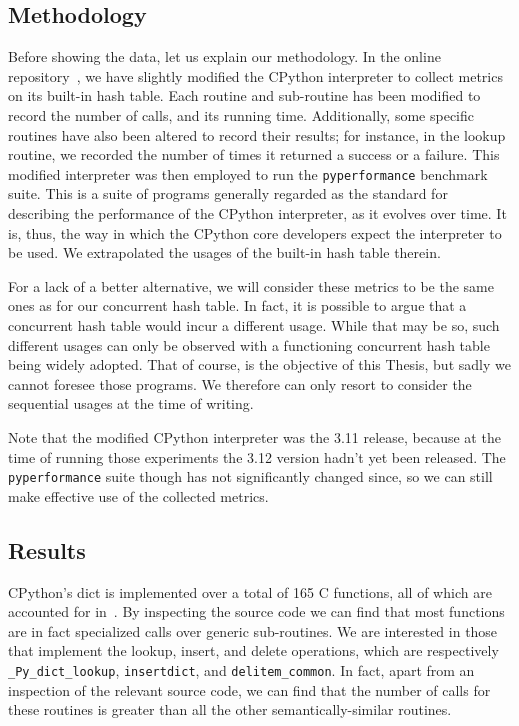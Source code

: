 \subsection{Methodology}\label{subsec:dict-metrics-methodology}

Before showing the data, let us explain our methodology.
In the online repository~\cite{dict-metrics}, we have slightly modified the CPython interpreter to collect metrics on its built-in hash table.
Each routine and sub-routine has been modified to record the number of calls, and its running time.
Additionally, some specific routines have also been altered to record their results; for instance, in the lookup routine, we recorded the number of times it returned a success or a failure.
This modified interpreter was then employed to run the \texttt{pyperformance} benchmark suite.
This is a suite of programs generally regarded as the standard for describing the performance of the CPython interpreter, as it evolves over time.
It is, thus, the way in which the CPython core developers expect the interpreter to be used.
We extrapolated the usages of the built-in hash table therein.

For a lack of a better alternative, we will consider these metrics to be the same ones as for our concurrent hash table.
In fact, it is possible to argue that a concurrent hash table would incur a different usage.
While that may be so, such different usages can only be observed with a functioning concurrent hash table being widely adopted.
That of course, is the objective of this Thesis, but sadly we cannot foresee those programs.
We therefore can only resort to consider the sequential usages at the time of writing.

Note that the modified CPython interpreter was the 3.11 release, because at the time of running those experiments the 3.12 version hadn't yet been released.
The \texttt{pyperformance} suite though has not significantly changed since, so we can still make effective use of the collected metrics.

\subsection{Results}\label{subsec:dict-metrics-results}

CPython's dict is implemented over a total of 165 C functions, all of which are accounted for in~\cite{dict-metrics}.
By inspecting the source code we can find that most functions are in fact specialized calls over generic sub-routines.
We are interested in those that implement the lookup, insert, and delete operations, which are respectively \texttt{\_Py\_dict\_lookup}, \texttt{insertdict}, and \texttt{delitem\_common}.
In fact, apart from an inspection of the relevant source code, we can find that the number of calls for these routines is greater than all the other semantically-similar routines.

